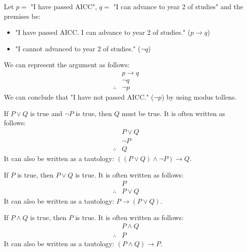 \begin{eg}
    Let $p =$ "I have passed AICC", $q =$ "I can advance to year 2 of studies" and the premises be:
    \begin{itemize}[itemsep=1pt,label=$\circ$]
        \item "I have passed AICC. I can advance to year 2 of studies." ($p \to q$)
        \item "I cannot advanced to year 2 of studies." ($\neg q$)
    \end{itemize}
    We can represent the argument as follows:
    \[
        \begin{array}{rl}
            & p \to q \\
            & \neg q \\
            \hline
            \therefore & \neg p
        \end{array}
    \]
    We can conclude that "I have not passed AICC." ($\neg p$) by using modus tollens.
\end{eg}

\begin{definition}
    If $P \lor Q$ is true and $\neg P$ is true, then $Q$ must be true. It is often written as follows:
    \[
        \begin{array}{rl}
            & P \lor Q \\
            & \neg P \\
            \hline
            \therefore & Q
        \end{array}
    \]
    It can also be written as a tautology: $((P \lor Q) \land \neg P) \to Q$.
\end{definition}

\begin{definition}[Addition]
    If $P$ is true, then $P \lor Q$ is true. It is often written as follows:
    \[
        \begin{array}{rl}
            & P \\
            \hline
            \therefore & P \lor Q
        \end{array}
    \]
    It can also be written as a tautology: $P \to (P \lor Q)$.
\end{definition}

\begin{definition}[Simplification]
    If $P \land Q$ is true, then $P$ is true. It is often written as follows:
    \[
        \begin{array}{rl}
            & P \land Q \\
            \hline
            \therefore & P
        \end{array}
    \]
    It can also be written as a tautology: $(P \land Q) \to P$.
\end{definition}

